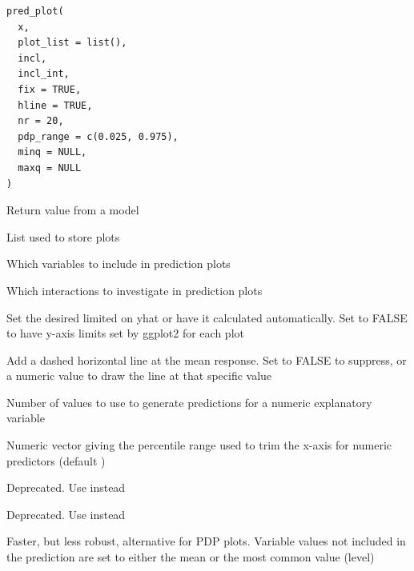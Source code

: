 \documentclass[a4paper]{book}
\begin{document}
%
\begin{Usage}
\begin{verbatim}
pred_plot(
  x,
  plot_list = list(),
  incl,
  incl_int,
  fix = TRUE,
  hline = TRUE,
  nr = 20,
  pdp_range = c(0.025, 0.975),
  minq = NULL,
  maxq = NULL
)
\end{verbatim}
\end{Usage}
%
\begin{Arguments}
\begin{ldescription}
\item[\code{x}] Return value from a model

\item[\code{plot\_list}] List used to store plots

\item[\code{incl}] Which variables to include in prediction plots

\item[\code{incl\_int}] Which interactions to investigate in prediction plots

\item[\code{fix}] Set the desired limited on yhat or have it calculated automatically.
Set to FALSE to have y-axis limits set by ggplot2 for each plot

\item[\code{hline}] Add a dashed horizontal line at the mean response. Set to FALSE to suppress,
or a numeric value to draw the line at that specific value

\item[\code{nr}] Number of values to use to generate predictions for a numeric explanatory variable

\item[\code{pdp\_range}] Numeric vector  giving the percentile range used to trim the
x-axis for numeric predictors (default )

\item[\code{minq}] Deprecated. Use  instead

\item[\code{maxq}] Deprecated. Use  instead
\end{ldescription}
\end{Arguments}
%
\begin{Details}
Faster, but less robust, alternative for PDP plots. Variable
values not included in the prediction are set to either the mean or
the most common value (level)
\end{Details}
\end{document}
